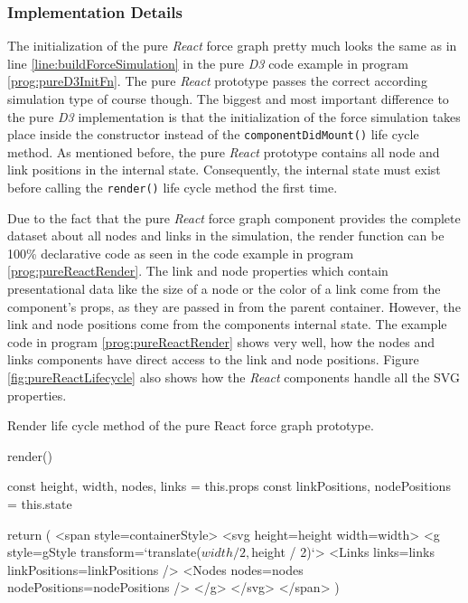 \subsubsection{Implementation Details}

The initialization of the pure \emph{React} force graph pretty much looks the same as in line \ref{line:buildForceSimulation} in the pure \emph{D3} code example in program \ref{prog:pureD3InitFn}. The pure \emph{React} prototype passes the correct according simulation type of course though. The biggest and most important difference to the pure \emph{D3} implementation is that the initialization of the force simulation takes place inside the constructor instead of the \texttt{componentDidMount()} life cycle method. As mentioned before, the pure \emph{React} prototype contains all node and link positions in the internal state. Consequently, the internal state must exist before calling the \texttt{render()} life cycle method the first time.

Due to the fact that the pure \emph{React} force graph component provides the complete dataset about all nodes and links in the simulation, the render function can be 100\% declarative code as seen in the code example in program \ref{prog:pureReactRender}. The link and node properties which contain presentational data like the size of a node or the color of a link come from the component's props, as they are passed in from the parent container. However, the link and node positions come from the components internal state. The example code in program \ref{prog:pureReactRender} shows very well, how the nodes and links components have direct access to the link and node positions. Figure \ref{fig:pureReactLifecycle} also shows how the \emph{React} components handle all the SVG properties.

\begin{program}
\caption{Render life cycle method of the pure React force graph prototype.}
\label{prog:pureReactRender}
\begin{JsCode}
render() {
  const { height, width, nodes, links } = this.props
  const { linkPositions, nodePositions } = this.state
  
  return (
    <span style={containerStyle}>
      <svg height={height} width={width}>
        <g style={gStyle} transform={`translate(${width / 2},${height / 2})`}>
          <Links links={links} linkPositions={linkPositions} />
          <Nodes nodes={nodes} nodePositions={nodePositions} />
        </g>
      </svg>
    </span>
  )
}
\end{JsCode}
\end{program}

